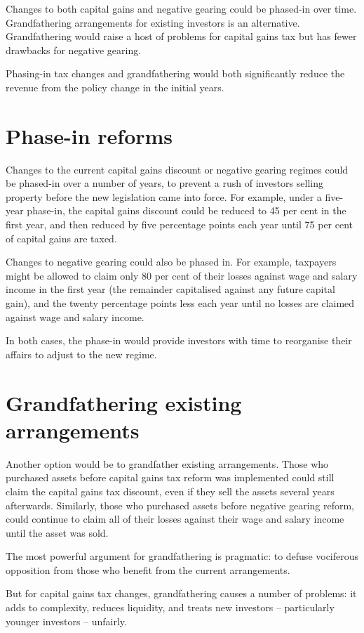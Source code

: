 Changes to both capital gains and negative gearing could be phased-in over time. Grandfathering arrangements for existing investors is an alternative. Grandfathering would raise a host of problems for capital gains tax but has fewer drawbacks for negative gearing. 

Phasing-in tax changes and grandfathering would both significantly reduce the revenue from the policy change in the initial years. 

\section{Phase-in reforms}
Changes to the current capital gains discount or negative gearing regimes could be phased-in over a number of years, to prevent a rush of investors selling property before the new legislation came into force. For example, under a five-year phase-in, the capital gains discount could be reduced to 45 per cent in the first year, and then reduced by five percentage points each year until 75 per cent of capital gains are taxed. 

Changes to negative gearing could also be phased in. For example, taxpayers might be allowed to claim only 80 per cent of their losses against wage and salary income in the first year (the remainder capitalised against any future capital gain), and the twenty percentage points less each year until no losses are claimed against wage and salary income.

In both cases, the phase-in would provide investors with time to reorganise their affairs to adjust to the new regime.

\section{Grandfathering existing arrangements}
Another option would be to grandfather existing arrangements. Those who purchased assets before capital gains tax reform was implemented could still claim the capital gains tax discount, even if they sell the assets several years afterwards. Similarly, those who purchased assets before negative gearing reform, could continue to claim all of their losses against their wage and salary income until the asset was sold.

The most powerful argument for grandfathering is pragmatic: to defuse vociferous opposition from those who benefit from the current arrangements.

But for capital gains tax changes, grandfathering causes a number of problems: it adds to complexity, reduces liquidity, and treats new investors – particularly younger investors – unfairly.

